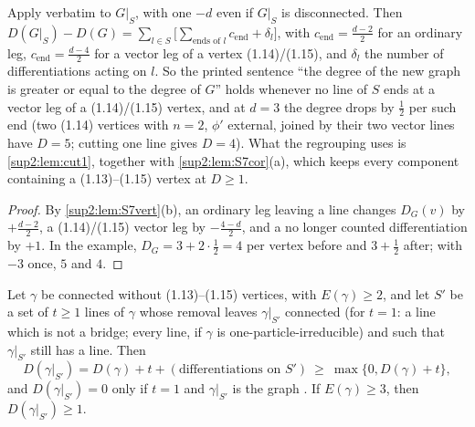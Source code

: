 \begin{lemma}\label{sup2:lem:cut2}
Apply \cite[(2.2)]{Ba3} verbatim to $G|_S$, with one $-d$ even if $G|_S$ is disconnected. Then $D(G|_S)-D(G)=\sum_{l\in S}\big[\sum_{\text{ends of }l}c_{\mathrm{end}}+\delta_l\big]$, with $c_{\mathrm{end}}=\frac{d-2}2$ for an ordinary leg, $c_{\mathrm{end}}=\frac{d-4}2$ for a vector leg of a vertex (1.14)/(1.15), and $\delta_l$ the number of differentiations acting on $l$. So the printed sentence ``the degree of the new graph is greater or equal to the degree of $G$'' holds whenever no line of $S$ ends at a vector leg of a (1.14)/(1.15) vertex, and at $d=3$ the degree drops by $\frac12$ per such end (two (1.14) vertices with $n=2$, $\phi'$ external, joined by their two vector lines have $D=5$; cutting one line gives $D=4$). What the regrouping uses is \cref{sup2:lem:cut1}, together with \cref{sup2:lem:S7cor}(a), which keeps every component containing a (1.13)--(1.15) vertex at $D\ge1$.
\end{lemma}

\begin{proof}
By \cref{sup2:lem:S7vert}(b), an ordinary leg leaving a line changes $D_G(v)$ by $+\frac{d-2}2$, a (1.14)/(1.15) vector leg by $-\frac{4-d}2$, and a no longer counted differentiation by $+1$. In the example, $D_G=3+2\cdot\frac12=4$ per vertex before and $3+\frac12$ after; with $-3$ once, $5$ and $4$.
\end{proof}

\begin{lemma}[cutting a divergent graph; $d=3$]\label{sup2:lem:cut3}
Let $\gamma$ be connected without (1.13)--(1.15) vertices, with $E(\gamma)\ge2$, and let $S'$ be a set of $t\ge1$ lines of $\gamma$ whose removal leaves $\gamma|_{S'}$ connected (for $t=1$: a line which is not a bridge; every line, if $\gamma$ is one-particle-irreducible) and such that $\gamma|_{S'}$ still has a line. Then
\[
D(\gamma|_{S'})=D(\gamma)+t+(\text{differentiations on }S')\ \ge\ \max\{0,D(\gamma)+t\},
\]
and $D(\gamma|_{S'})=0$ only if $t=1$ and $\gamma|_{S'}$ is the graph \cite[(2.4)]{Ba3}. If $E(\gamma)\ge3$, then $D(\gamma|_{S'})\ge1$.
\end{lemma}

